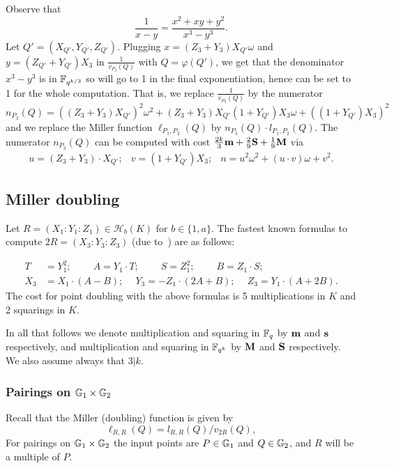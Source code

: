 Observe that
\[\frac{1}{x-y} = \frac{x^2 + xy + y^2}{x^3-y^3}.\]
Let $Q' = (X_{Q'},Y_{Q'},Z_{Q'})$.
Plugging $x = (Z_3 + Y_3)X_{Q'}\omega$ and $y = (Z_{Q'}+Y_{Q'})X_3$ in $\frac{1}{v_{P_3}(Q)}$ with $Q = \varphi(Q')$,
we get that the denominator $x^3 - y^3$ is in $\mathbb{F}_{q^{k/3}}$ so will go to 1 in the final exponentiation, hence can be set to 1 for the whole computation.
That is, we replace $\frac{1}{v_{P_3}(Q)}$ by the numerator 
$$n_{P_3}(Q) = ((Z_3 + Y_3)X_{Q'})^2\omega^2 
+ (Z_3 + Y_3)X_{Q'}(1+Y_{Q'})X_3\omega 
+ ((1+Y_{Q'})X_3)^2$$
and we replace the Miller function 
$\ell_{P_1,P_2}(Q)$ by $n_{P_3}(Q) \cdot l_{P_1,P_2}(Q)$.
The numerator $n_{P_3}(Q)$ can be computed with cost
$\frac{2k}{3}\textbf{m} + \frac{2}{9}\textbf{S} + \frac{1}{9}\textbf{M}$ via
\[\begin{array}{cccc}
u = (Z_3 + Y_3)\cdot X_{Q'}; &
v = (1+Y_{Q'})X_3; &
n = u^2\omega^2 + (u\cdot v)\omega + v^2.
\end{array}\]

\subsection{Miller doubling}

Let $R = (X_1 : Y_1 : Z_1) \in \mathcal{H}_b(K)$ for $b \in \{1,a\}$.
The fastest known formulas to compute $2R = (X_3 : Y_3 : Z_3)$
(due to~\cite{2015/hessian}) are as follows:

\begin{align*}
T &= Y_1^2;\	\qquad	A = Y_1 \cdot T;\	\qquad
S = Z_1 ^ 2;\	\qquad	B = Z_1 \cdot S;\\
X_3 &= X_1 \cdot (A - B);\	\quad
Y_3 = -Z_1 \cdot (2A + B);\	\quad
Z_3 = Y_1 \cdot (A + 2B).
\end{align*}
The cost for point doubling with the above formulas is 5 multiplications in $K$ and 2 squarings in $K$.

In all that follows we denote multiplication and squaring in $\mathbb{F}_{q}$ by $\textbf{m}$ and $\textbf{s}$ respectively, and multiplication and squaring in $\mathbb{F}_{q^k}$ by $\textbf{M}$ and $\textbf{S}$ respectively. We also assume always that $3|k$.

\subsubsection{Pairings on $\mathbb{G}_{1} \times \mathbb{G}_{2}$}

Recall that the Miller (doubling) function is given by
$$\ell_{R,R}(Q) = l_{R,R}(Q)/v_{2R}(Q),$$
For pairings on $\mathbb{G}_{1} \times \mathbb{G}_{2}$ the input points are
$P \in \mathbb{G}_{1}$ and $Q \in \mathbb{G}_{2}$, and
$R$ will be a multiple of $P$.

